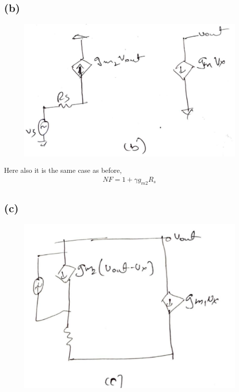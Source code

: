\documentclass{article}
\begin{document}
\subsection*{(b)}
\begin{figure}[H]
	\centering
	\includegraphics[scale=0.25]{./figs/q6b.jpeg}
\end{figure}
Here also it is the same case as before,
\begin{gather*}
	NF = 1 + \gamma g_{m2}R_s
\end{gather*}
\subsection*{(c)}
\begin{figure}[H]
	\centering
	\includegraphics[scale=0.25]{./figs/q6c.jpeg}
\end{figure}
\end{document}
